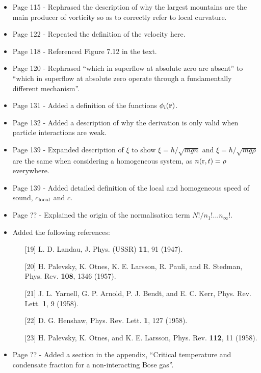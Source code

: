 \documentclass{article}
\begin{document}
\begin{itemize}
\item Page 115 - Rephrased the description of why the largest mountains are the main producer of vorticity so as to correctly refer to local curvature.
\item Page 122 - Repeated the definition of the velocity here.
\item Page 118 - Referenced Figure 7.12 in the text.
\item Page 120 - Rephrased ``which in superflow at absolute zero are absent'' to ``which in superflow at absolute zero operate through a fundamentally different mechanism''.
\item Page 131 - Added a definition of the functions $\phi_i({\bf r})$.
\item Page 132 - Added a description of why the derivation is only valid when particle interactions are weak.
\item Page 139 - Expanded description of $\xi$ to show $\xi = \hbar/\sqrt{mgn}$ and $\xi = \hbar/\sqrt{mg\rho}$ are the same when considering a homogeneous system, as $n({\rm r},t) = \rho$ everywhere.
\item Page 139 - Added detailed definition of the local and homogeneous speed of sound, $c_{\rm local}$ and $c$.
\item Page ?? - Explained the origin of the normalisation term $N!/n_1!...n_\infty!$.

\item Added the following references:
\begin{itemize}
\item[][19] L. D. Landau, J. Phys. (USSR) {\bf 11}, 91 (1947).
\item[][20] H. Palevsky, K. Otnes, K. E. Larsson, R. Pauli, and R. Stedman, Phys. Rev. {\bf 108}, 1346
(1957).
\item[][21] J. L. Yarnell, G. P. Arnold, P. J. Bendt, and E. C. Kerr, Phys. Rev. Lett. {\bf 1}, 9 (1958).
\item[][22] D. G. Henshaw, Phys. Rev. Lett. {\bf 1}, 127 (1958).
\item[][23] H. Palevsky, K. Otnes, and K. E. Larsson, Phys. Rev. {\bf 112}, 11 (1958).
\end{itemize}


\item Page ?? - Added a section in the appendix, ``Critical temperature and condensate fraction for a non-interacting
Bose gas''.

\end{itemize}
\end{document}
